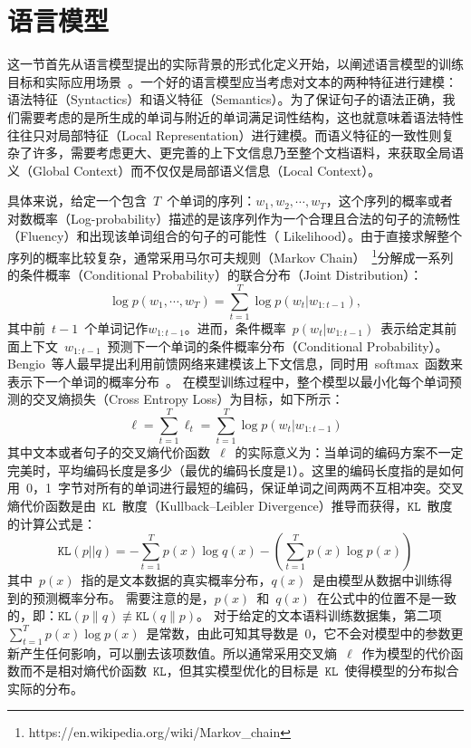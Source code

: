 \section{语言模型}
这一节首先从语言模型提出的实际背景的形式化定义开始，以阐述语言模型的训练目标和实际应用场景~。一个好的语言模型应当考虑对文本的两种特征进行建模：语法特征（Syntactics）和语义特征（Semantics）。为了保证句子的语法正确，我们需要考虑的是所生成的单词与附近的单词满足词性结构，这也就意味着语法特性往往只对局部特征（Local Representation）进行建模。而语义特征的一致性则复杂了许多，需要考虑更大、更完善的上下文信息乃至整个文档语料，来获取全局语义（Global Context）而不仅仅是局部语义信息（Local Context）。


具体来说，给定一个包含~$T$~个单词的序列：$w_1,w_2,\cdots,w_T$，这个序列的概率或者对数概率（Log-probability）描述的是该序列作为一个合理且合法的句子的流畅性（Fluency）和出现该单词组合的句子的可能性（ Likelihood）。由于直接求解整个序列的概率比较复杂，通常采用马尔可夫规则（Markov Chain）~\footnote{https://en.wikipedia.org/wiki/Markov\_chain}分解成一系列的条件概率（Conditional Probability）的联合分布（Joint Distribution）：
\begin{equation}
\label{laguage_model}
 \log p(w_1,\cdots, w_T ) = \sum_{t=1}^T \log p(w_t | w_{1:t-1}),
\end{equation}
其中前~$t-1$~个单词记作$w_ {1:t-1}$。进而，条件概率~$p(w_t|w_{1:t-1})$~表示给定其前面上下文~$w_{1:t-1}$~预测下一个单词的条件概率分布（Conditional Probability）。Bengio~等人最早提出利用前馈网络来建模该上下文信息，同时用~softmax~函数来表示下一个单词的概率分布~。
在模型训练过程中，整个模型以最小化每个单词预测的交叉熵损失（Cross Entropy Loss）为目标，如下所示：
\begin{equation}\label{equ:losses2}
  \ell=\sum_{t=1}^{T}\ell_t=\sum_{t=1}^{T}\log p(w_t | w_{1:t-1})
\end{equation}
其中文本或者句子的交叉熵代价函数~$\ell$~的实际意义为：当单词的编码方案不一定完美时，平均编码长度是多少（最优的编码长度是1）。这里的编码长度指的是如何用~0，1~字节对所有的单词进行最短的编码，保证单词之间两两不互相冲突。交叉熵代价函数是由~$\texttt{KL}$~散度（Kullback–Leibler Divergence）推导而获得，$\mathtt{KL}$~散度的计算公式是：
\begin{equation}\label{equ:losses}
  \mathtt{KL}(p||q)=-\sum_{t=1}^{T}p(x)\log q(x) - (\sum_{t=1}^{T}p(x)\log p(x))
\end{equation}
其中~$p(x)$~指的是文本数据的真实概率分布，$q(x)$~是由模型从数据中训练得到的预测概率分布。
需要注意的是，$p(x)$~和~$q(x)$~在公式中的位置不是一致的，即：$\texttt{KL}(p\parallel q)\not\equiv \texttt{KL}(q\parallel p)$。
对于给定的文本语料训练数据集，第二项~$\sum_{t=1}^{T}p(x)\log p(x)$~是常数，由此可知其导数是~0，它不会对模型中的参数更新产生任何影响，可以删去该项数值。所以通常采用交叉熵~$\ell$~作为模型的代价函数而不是相对熵代价函数~$\mathtt{KL}$，但其实模型优化的目标是~$\mathtt{KL}$~使得模型的分布拟合实际的分布。

